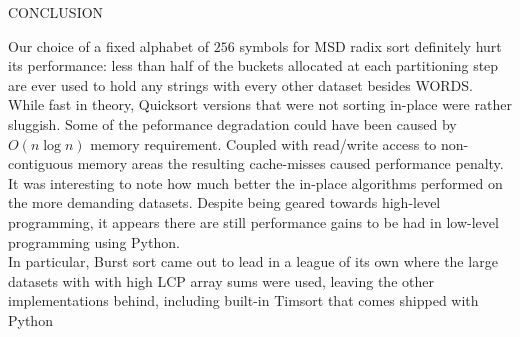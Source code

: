  {\sffamily\normalsize{\color{sciorange}CONCLUSION}}\vspace{-7mm}\small\\
 \footnotesize 
\begin{multicols}{3}
Our choice of a fixed alphabet of $256$ symbols for MSD radix sort definitely
hurt its performance: less than half of the buckets allocated at each
partitioning step are ever used to hold any strings with every other dataset
besides WORDS.\\

While fast in theory, Quicksort versions that were not sorting in-place were rather sluggish. Some of the peformance degradation could have been caused by $O(n \log n)$  memory requirement. Coupled with read/write access to non-contiguous memory areas the resulting cache-misses caused performance penalty.\\

It was interesting to note how much better the in-place algorithms performed on
the more demanding datasets.  Despite being geared towards high-level
programming, it appears there are still performance gains to be had in
low-level programming using Python.\\

In particular, Burst sort came out to lead in a league of its own where the large datasets with with high LCP array sums were used, leaving the other implementations behind, including built-in Timsort that comes shipped with Python
\end{multicols}